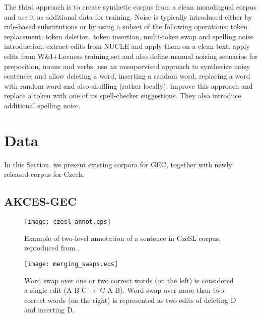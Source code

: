 \documentclass[11pt,a4paper]{article}
\begin{document}
The third approach is to create synthetic corpus from a clean monolingual corpus and use it as additional data for training. Noise is typically introduced either by rule-based substitutions or by using a subset of the following operations: token replacement, token deletion, token insertion, multi-token swap and spelling noise introduction.  extract edits from NUCLE and apply them on a clean text.  apply edits from W\&I+Locness training set and also define manual noising scenarios for preposition, nouns and verbs.  use an unsupervised approach to synthesize noisy sentences and allow deleting a word, inserting a random word, replacing a word with random word and also shuffling (rather locally).  improve this approach and replace a token with one of its spell-checker suggestions. They also introduce additional spelling noise.
 



\section{Data}

In this Section, we present existing corpora for GEC, together with newly released corpus for Czech.


\subsection{AKCES-GEC}

\begin{figure*}[ht!]
    \centering
    \texttt{[image: czesl\_annot.eps]}
    \caption{Example of two-level annotation of a sentence in CzeSL corpus, reproduced from \cite{Rosen:2016a}.}
    \label{fig:czesl_annot}
\end{figure*}

\begin{figure*}[ht!]
    \centering
    \texttt{[image: merging\_swaps.eps]}
    \caption{Word swap over one or two correct words (on the left) is considered
    a single edit (A B C$\rightarrow$ C A B). Word swap over more than
    two correct words (on the right) is represented as two edits of deleting D and inserting D.}
    \label{fig:merging_swaps}
\end{figure*}
\end{document}
